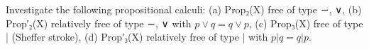 Investigate the following propositional calculi: (a) Prop₂(X) free of type {∼, ∨}, (b) Prop′₂(X) relatively free of type {∼, ∨} with $p \lor q = q \lor p$, (c) Prop₃(X) free of type {|} (Sheffer stroke), (d) Prop′₃(X) relatively free of type {|} with $p|q = q|p$.
